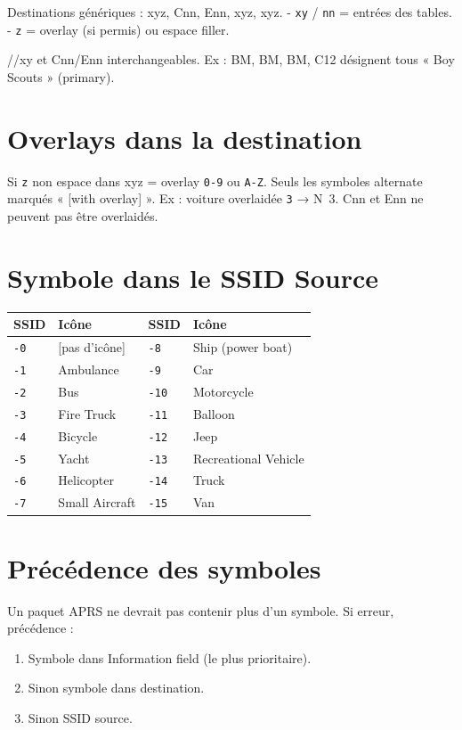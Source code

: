 Destinations génériques : {\ttfamily {}xyz}, {\ttfamily {}Cnn},
{\ttfamily {}Enn}, {\ttfamily {}xyz}, {\ttfamily {}xyz}. - \texttt{xy} /
\texttt{nn} = entrées des tables. - \texttt{z} = overlay (si permis) ou
espace filler.

{\ttfamily {}//xy} et {\ttfamily {}Cnn/Enn} interchangeables. Ex :
{\ttfamily {}BM}, {\ttfamily {}BM}, {\ttfamily {}BM}, {\ttfamily {}C12}
désignent tous « Boy Scouts » (primary).

\section{Overlays dans la
destination}\label{overlays-dans-la-destination}

Si \texttt{z} non espace dans {\ttfamily {}xyz} = overlay \texttt{0-9} ou
\texttt{A-Z}. Seuls les symboles alternate marqués « {[}with overlay{]}
». Ex : voiture overlaidée \texttt{3} → {\ttfamily {}N\ 3}.
{\ttfamily {}Cnn} et {\ttfamily {}Enn} ne peuvent pas être overlaidés.

\section{Symbole dans le SSID
Source}\label{symbole-dans-le-ssid-source}

\begin{longtable}[]{@{}llll@{}}
\toprule\noalign{}
SSID & Icône & SSID & Icône \\
\midrule\noalign{}
\endhead
\bottomrule\noalign{}
\endlastfoot
\texttt{-0} & {[}pas d'icône{]} & \texttt{-8} & Ship (power boat) \\
\texttt{-1} & Ambulance & \texttt{-9} & Car \\
\texttt{-2} & Bus & \texttt{-10} & Motorcycle \\
\texttt{-3} & Fire Truck & \texttt{-11} & Balloon \\
\texttt{-4} & Bicycle & \texttt{-12} & Jeep \\
\texttt{-5} & Yacht & \texttt{-13} & Recreational Vehicle \\
\texttt{-6} & Helicopter & \texttt{-14} & Truck \\
\texttt{-7} & Small Aircraft & \texttt{-15} & Van \\
\end{longtable}

\section{Précédence des
symboles}\label{pruxe9cuxe9dence-des-symboles}

Un paquet APRS ne devrait pas contenir plus d'un symbole. Si erreur,
précédence :

\begin{enumerate}
\def\labelenumi{\arabic{enumi}.}
\tightlist
\item
  Symbole dans Information field (le plus prioritaire).
\item
  Sinon symbole dans destination.
\item
  Sinon SSID source.
\end{enumerate}

